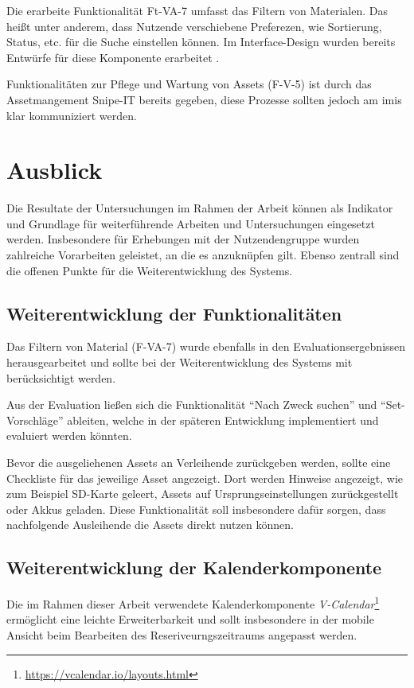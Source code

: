 Die erarbeite Funktionalität Ft-VA-7 umfasst das Filtern von Materialen. Das
heißt unter anderem, dass Nutzende verschiebene Preferezen, wie Sortierung,
Status, etc. für die Suche einstellen können. Im Interface-Design wurden bereits
Entwürfe für diese Komponente erarbeitet .

Funktionalitäten zur Pflege und Wartung von Assets (F-V-5) ist durch das
Assetmangement Snipe-IT bereits gegeben, diese Prozesse sollten jedoch am
\ac{imis} klar kommuniziert werden.


\section{Ausblick}
Die Resultate der Untersuchungen im Rahmen der Arbeit können als Indikator und
Grundlage für weiterführende Arbeiten und Untersuchungen eingesetzt werden.
Insbesondere für Erhebungen mit der Nutzendengruppe wurden zahlreiche
Vorarbeiten geleistet, an die es anzuknüpfen gilt. Ebenso zentrall sind die
offenen Punkte für die Weiterentwicklung des Systems.

\subsection{Weiterentwicklung der Funktionalitäten}
Das Filtern von Material (F-VA-7) wurde ebenfalls in den Evaluationsergebnissen
herausgearbeitet und sollte bei der Weiterentwicklung des Systems mit
berücksichtigt werden.

Aus der Evaluation ließen sich die Funktionalität \enquote{Nach Zweck suchen}
und \enquote{Set-Vorschläge} ableiten, welche in der späteren Entwicklung
implementiert und evaluiert werden könnten.

Bevor die ausgeliehenen Assets an Verleihende zurückgeben werden, sollte eine
Checkliste für das jeweilige Asset angezeigt. Dort werden Hinweise angezeigt,
wie zum Beispiel SD-Karte geleert, Assets auf Ursprungseinstellungen
zurückgestellt oder Akkus geladen. Diese Funktionalität soll insbesondere dafür
sorgen, dass nachfolgende Ausleihende die Assets direkt nutzen können.

\subsection{Weiterentwicklung der Kalenderkomponente}
Die im Rahmen dieser Arbeit verwendete Kalenderkomponente
\textit{V-Calendar}\footnote{\url{https://vcalendar.io/layouts.html}} ermöglicht
eine leichte Erweiterbarkeit und sollt insbesondere in der mobile Ansicht beim
Bearbeiten des Reseriveurngszeitraums angepasst werden.

